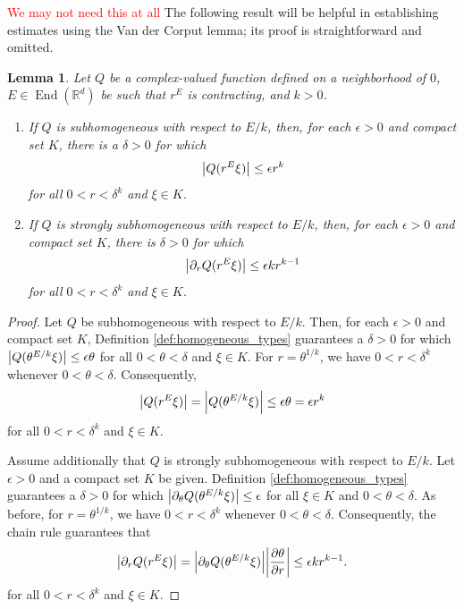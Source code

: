 \documentclass[11pt]{article}
\newtheorem{lemma}[theorem]{Lemma}
\newcommand\End{\operatorname{End}} %
\newcommand{\p}{\partial}
\newcommand{\f}[2]{\frac{#1}{#2}}
\begin{document}
\textcolor{red}{We may not need this at all} The following result will be helpful in establishing estimates using the Van der Corput lemma; its proof is straightforward and omitted.
\begin{lemma}\label{lem:ScalingofSubHomogeneous}
Let $Q$ be a complex-valued function defined on a neighborhood of $0$, $E\in\End(\mathbb{R}^d)$ be such that $r^E$ is contracting, and $k>0$.
\begin{enumerate}
\item If $Q$ is subhomogeneous with respect to $E/k$, then, for each $\epsilon>0$ and compact set $K$, there is a $\delta>0$ for which 
\begin{equation*}
\abs{Q(r^{E}\xi)}\leq \epsilon r^k
\end{equation*}
for all $0<r<\delta^k$ and $\xi\in K$.
\item If $Q$ is strongly subhomogeneous with respect to $E/k$, then, for each $\epsilon>0$ and compact set $K$, there is $\delta>0$ for which
\begin{equation*}
\abs{\partial_r Q(r^E\xi)}\leq \epsilon k  r^{k-1}
\end{equation*}
for all $0<r<\delta^k$ and $\xi\in K$.
\end{enumerate}
\end{lemma}
\begin{proof}
Let $Q$ be subhomogeneous with respect to $E/k$. Then, for each $\epsilon > 0$ and compact set $K$, Definition \ref{def:homogeneous_types} guarantees a $\delta> 0$ for which 
$\abs{Q(\theta^{E/k} \xi)} \leq \epsilon \theta$ for all $0 < \theta < \delta$ and $\xi \in K$. For $r = \theta^{1/k}$, we have $0<r<\delta^k$ whenever $0<\theta<\delta$. Consequently,
\begin{equation*}
    \abs{Q(r^E \xi)} =\abs{Q(\theta^{E/k}\xi)} \leq \epsilon \theta= \epsilon r^k
\end{equation*}
for all $0 < r < \delta^k$ and $\xi \in K$. 

Assume additionally that $Q$ is strongly subhomogeneous with respect to $E/k$. Let $\epsilon > 0$ and a compact set $K$ be given. Definition \ref{def:homogeneous_types} guarantees a $\delta> 0$ for which $\abs{\p_\theta Q(\theta^{E/k} \xi)} \leq \epsilon$ for all $\xi \in K$ and $0 < \theta < \delta$. As before, for $r = \theta^{1/k}$, we have $0<r<\delta^k$ whenever $0<\theta<\delta$. Consequently, the chain rule guarantees that
\begin{equation*}
    \abs{\p_r Q(r^{E} \xi)} = \abs{\p_\theta Q(\theta^{E/k} \xi)} 
    \abs{\f{\p \theta}{\p r}} \leq \epsilon k  r^{k-1}.
\end{equation*}
for all $0 < r < \delta^k$ and $\xi \in K$. 
\end{proof}
\end{document}
